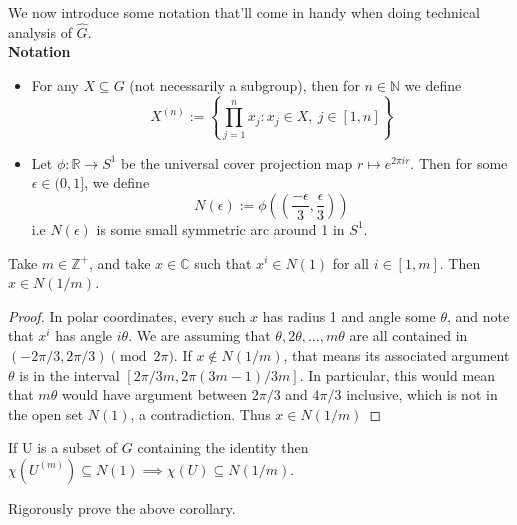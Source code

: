\documentclass[11pt, x11names]{article}
\newcommand{\nn}{\mathbb{N}}
\newcommand{\zz}{\mathbb{Z}}
\newcommand{\rr}{\mathbb{R}}
\newcommand{\cc}{\mathbb{C}}
\newcommand{\set}[1]{\left\{ #1 \right\}}
\renewcommand{\brack}[1]{\left(   #1 \right)}
\renewcommand{\hat}{\widehat}
\begin{document}
We now introduce some notation that'll come in handy when doing technical analysis of $\hat{G}$.\\
\textbf{Notation}
\begin{itemize}
    \item For any $X \subseteq G$ (not necessarily a subgroup), then for $n \in \nn$ we define
    \begin{equation*}
        X^{(n)} := \set{\prod^n_{j=1} x_j: x_j \in X, \ j \in [1, n]}
    \end{equation*}
    \item Let $\phi: \rr \to S^1$ be the universal cover projection map $r \mapsto e^{2 \pi i r}$.
    Then for some $\epsilon \in (0, 1]$, we define
    \begin{equation*}
        N(\epsilon) := \phi\brack{\brack{\frac{-\epsilon}{3}, \frac{\epsilon}{3}}}
    \end{equation*}
    i.e $N(\epsilon)$ is some small symmetric arc around 1 in $S^1$.
\end{itemize}

\begin{lemma}
\label{compact-open key lemma}
Take $m \in \zz^+$, and take $x \in \cc$ such that $x^i \in N(1)$ for all $i \in [1, m]$.
Then $x \in N(1/m)$.
\end{lemma}
\begin{proof}
In polar coordinates, every such $x$ has radius 1 and angle some $\theta$, and note that $x^i$
has angle $i \theta$. We are assuming that $\theta, 2 \theta, \ldots, m\theta$ are all 
contained in $(-2\pi/3, 2\pi/3) \pmod{2\pi}$. If $x \notin N(1/m)$, that means its associated
argument $\theta$ is in the interval $[2\pi/3m, 2\pi (3m - 1)/3m]$. In particular, this would mean that $m \theta$ would have argument between $2 \pi / 3$ and $4\pi/3$ inclusive, which is not in the open set $N(1)$, a contradiction. Thus $x \in N(1/m)$
\end{proof}
\begin{corollary}
\label{compact-open key corollary}
    If U is a subset of $G$ containing the identity then $\chi(U^{(m)}) \subseteq N(1) \implies \chi(U) \subseteq N(1/m)$. 
\end{corollary}

\begin{exercise}
Rigorously prove the above corollary.
\end{exercise}
\end{document}
